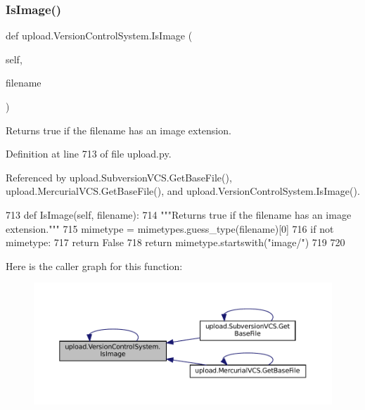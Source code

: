 \subsubsection{\texorpdfstring{Is\+Image()}{IsImage()}\hspace{0.1cm}{\footnotesize\ttfamily [2/2]}}
{\footnotesize\ttfamily def upload.\+Version\+Control\+System.\+Is\+Image (\begin{DoxyParamCaption}\item[{}]{self,  }\item[{}]{filename }\end{DoxyParamCaption})}

\begin{DoxyVerb}Returns true if the filename has an image extension.\end{DoxyVerb}
 

Definition at line 713 of file upload.\+py.



Referenced by upload.\+Subversion\+V\+C\+S.\+Get\+Base\+File(), upload.\+Mercurial\+V\+C\+S.\+Get\+Base\+File(), and upload.\+Version\+Control\+System.\+Is\+Image().


\begin{DoxyCode}
713   \textcolor{keyword}{def }IsImage(self, filename):
714     \textcolor{stringliteral}{"""Returns true if the filename has an image extension."""}
715     mimetype =  mimetypes.guess\_type(filename)[0]
716     \textcolor{keywordflow}{if} \textcolor{keywordflow}{not} mimetype:
717       \textcolor{keywordflow}{return} \textcolor{keyword}{False}
718     \textcolor{keywordflow}{return} mimetype.startswith(\textcolor{stringliteral}{"image/"})
719 
720 
\end{DoxyCode}
Here is the caller graph for this function\+:
\nopagebreak
\begin{figure}[H]
\begin{center}
\leavevmode
\includegraphics[width=350pt]{classupload_1_1VersionControlSystem_a846889ecd2ef40870b456ddb5b349e02_icgraph}
\end{center}
\end{figure}
\mbox{\label{classupload_1_1VersionControlSystem_a7e334f967301b9e85e5a9c39f5036823}} 
